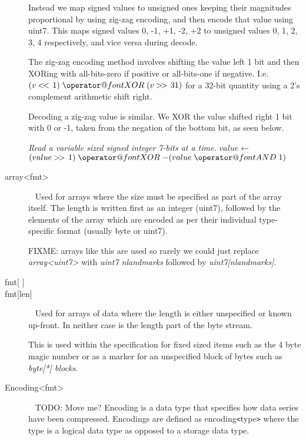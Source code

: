 \documentclass[a4paper]{article}
\makeatletter
\newcommand*{\bitand}{%
  \nonscript\mskip-\medmuskip\mkern5mu%
  \mathbin{\operator@font AND}\penalty900\mkern5mu%
  \nonscript\mskip-\medmuskip
}
\newcommand*{\bitxor}{%
  \nonscript\mskip-\medmuskip\mkern5mu%
  \mathbin{\operator@font XOR}\penalty900\mkern5mu%
  \nonscript\mskip-\medmuskip
}
\newcommand\shiftl{\mathbin{<\mkern-3mu<\,}}
\newcommand\shiftr{\mathbin{>\mkern-3mu>\,}}
\makeatother
\begin{document}
\begin{description}
Instead we map signed values to unsigned ones keeping their
magnitudes proportional by using zig-zag encoding, and then encode
that value using uint7. This maps signed values 0, -1, +1, -2, +2 to
unsigned values 0, 1, 2, 3, 4 respectively, and vice versa during
decode.

The zig-zag encoding method involves shifting the value left 1
bit and then XORing with all-bits-zero if positive or all-bits-one if
negative. I.e. $(v \shiftl 1) \bitxor (v \shiftr 31)$ for a
32-bit quantity using a 2's complement arithmetic shift right.

Decoding a zig-zag value is similar.  We XOR the value shifted right 1
bit with 0 or -1, taken from the negation of the bottom bit, as seen
below.

\begin{algorithmic}[1]
\Statex
\Statex \textit{Read a variable sized signed integer 7-bits at a time.}
  \State $value \gets $ 
  \State \Return $(value \shiftr 1) \bitxor -(value \bitand 1)$
  \EndFunction
\end{algorithmic}

\item[{array<fmt>}]\ \newline
Used for arrays where the size must be specified as part of the array itself.
The length is written first as an integer (uint7), followed by the elements of the 
array which are encoded as per their individual type-specific format
(usually byte or uint7).

{\color{gray}
FIXME: arrays like this are used so rarely we could just replace \textit{array<uint7>} with \textit{uint7 nlandmarks} followed by \textit{uint7[nlandmarks]}.
}

\item[{fmt[ ]}]
\item[{fmt[len]}]\ \newline
Used for arrays of data where the length is either unspecified or
known up-front.  In neither case is the length part of the byte stream.

This is used within the specification for fixed sized items such as
the 4 byte magic number or as a marker for an unspecified block of
bytes such as \textit{byte[*] blocks}.

\item[{Encoding<fmt>}]\ \newline
{\color{gray}
TODO: Move me?
}
Encoding is a data type that specifies how data series have been compressed. Encodings 
are defined as encoding\texttt{<}type\texttt{>} where the type is a logical data 
type as opposed to a storage data type.


\end{description}
\end{document}
